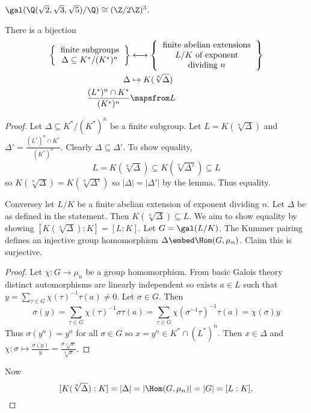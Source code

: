 \documentclass[a4paper]{article}
\theoremstyle{definition}
\begin{document}
\begin{eg}
  \(\gal(\Q(\sqrt 2, \sqrt 3, \sqrt 5)/\Q) \cong (\Z/2\Z)^3\).
\end{eg}

\begin{theorem}
  There is a bijection
  \begin{align*}
    \left\{
    \begin{tabular}{c}
      finite subgroups \\
      \(\Delta \subseteq K^*/(K^*)^n\)
    \end{tabular}
    \right\}
    &\longleftrightarrow
      \left\{
      \begin{tabular}{c}
        finite abelian extensions \\
        \(L/K\) of exponent \\
        dividing \(n\)
      \end{tabular}
    \right\} \\
    \Delta &\mapsto K(\sqrt[n] \Delta) \\
    \frac{(L^*)^n \cap K^*}{(K^*)^n} &\mapsfrom L
  \end{align*}
\end{theorem}

\begin{proof}
  Let \(\Delta \subseteq K^*/(K^*)^n\) be a finite subgroup. Let \(L = K(\sqrt[n]\Delta)\) and \(\Delta' = \frac{(L^*)^n \cap K^*}{(K^*)^n}\). Clearly \(\Delta \subseteq \Delta'\). To show equality,
  \[
    L = K(\sqrt[n]\Delta) \subseteq K(\sqrt[n]{\Delta'}) \subseteq L
  \]
  so \(K(\sqrt[n]\Delta) = K(\sqrt[n]{\Delta'})\) so \(|\Delta| = |\Delta'|\) by the lemma. Thus equality.

  Conversey let \(L/K\) be a finite abelian extension of exponent dividing \(n\). Let \(\Delta\) be as defined in the statement. Then \(K(\sqrt[n]{\Delta}) \subseteq L\). We aim to show equality by showing \([K(\sqrt[n]{\Delta}) : K] = [L : K]\). Let \(G = \gal(L/K)\). The Kummer pairing defines an injective group homomorphism \(\Delta \embed \Hom(G, \mu_n)\). Claim this is surjective.

  \begin{proof}
    Let \(\chi: G \to \mu_n\) be a group homomorphism. From basic Galois theory distinct automorphisms are linearly independent so exists \(a \in L\) such that \(y = \sum_{\tau \in G} \chi(\tau)^{-1} \tau(a) \neq 0\). Let \(\sigma \in G\). Then
    \[
      \sigma(y)
      = \sum_{\tau \in G} \chi(\tau)^{-1} \sigma \tau(a)
      = \sum_{\tau \in G} \chi(\sigma^{-1} \tau)^{-1} \tau(a)
      = \chi(\sigma) y
    \]
    Thus \(\sigma(y^n) = y^n\) for all \(\sigma \in G\) so \(x = y^n \in K^* \cap (L^*)^n\). Then \(x \in \Delta\) and \(\chi: \sigma \mapsto \frac{\sigma(y)}{y} = \frac{\sigma \sqrt[n]{x}}{\sqrt[n]{x}}\).
  \end{proof}

  Now
  \[
    [K(\sqrt[n]{\Delta}) : K] = |\Delta| = |\Hom(G, \mu_n)| = |G| = [L : K].
  \]
\end{proof}
\end{document}
